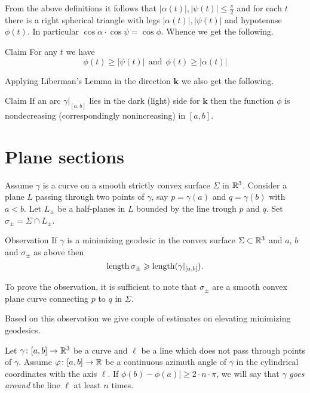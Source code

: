 \documentclass[a4paper,10pt]{amsart}
\begin{document}
From the above definitions it follows that $|\alpha(t)|,|\psi(t)|\le \tfrac\pi2$ and for each $t$ there is a right spherical triangle with legs $|\alpha(t)|,|\psi(t)|$ and hypotenuse $\phi(t)$.
In particular $\cos\alpha\cdot\cos\psi=\cos\phi$.
Whence we get the following.

\begin{thm}{Claim}\label{clm:alpha-phi-psi}
For any $t$ we have 
\[
\phi(t)\ge |\psi(t)|\ \ \text{and}\ \ \phi(t)\ge |\alpha(t)|
\]

\end{thm}

Applying Liberman's Lemma in the direction $\bm{k}$ we also get the following.

\begin{thm}{Claim}
If an arc $\gamma|_{[a,b]}$ lies in the dark (light) side for $\bm{k}$ then 
the function $\phi$ is nondecreasing (correspondingly nonincreasing)
in $[a,b]$.
\end{thm}

\section{Plane sections}

Assume $\gamma$ is a curve on a smooth strictly convex surface $\Sigma$ in $\mathbb{R}^3$.
Consider a plane $L$ 
passing through two points of $\gamma$, 
say $p=\gamma(a)$ and $q=\gamma(b)$ with $a<b$.
Let $L_\pm$ be a  half-planes in $L$ bounded by the line trough $p$ and $q$.
Set $\sigma_\pm=\Sigma\cap L_\pm$.

\begin{thm}{Observation}\label{obs:cut}
If $\gamma$ is a minimizing geodesic in the convex surface $\Sigma\subset \mathbb{R}^3$ and $a$, $b$ and $\sigma_\pm$ as above then
\[\mathop{\rm length}\nolimits\sigma_\pm\geqslant\mathop{\rm length}\nolimits(\gamma|_{[a,b]}).\]
\end{thm}

To prove the observation, it is sufficient to note that $\sigma_\pm$ are a smooth convex plane curve connecting $p$ to $q$ in $\Sigma$.

Based on this observation we give couple of estimates on elevating minimizing geodesics.

Let $\gamma\colon[a,b]\to\mathbb{R}^3$ be a curve and $\ell$ be a line which does not pass through points of $\gamma$.
Assume $\varphi\colon[a,b]\to\mathbb{R}$ be a continuous azimuth angle
of $\gamma$ in the cylindrical coordinates with the axis $\ell$.
If $\phi(b)-\phi(a)|\ge 2\cdot n\cdot\pi$,
we will say that $\gamma$ \emph{goes around} the line $\ell$
at least $n$ times.
\end{document}
